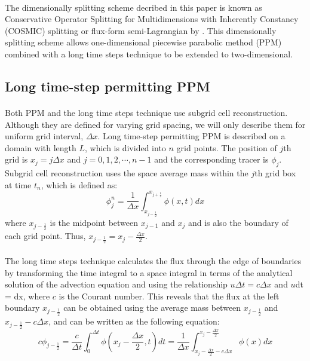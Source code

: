 \paragraph{}
The dimensionally splitting scheme decribed in this paper is known as Conservative Operator Splitting for Multidimensions with Inherently Constancy (COSMIC) splitting \citep{Leonard1996} or flux-form semi-Lagrangian by \citep{Lin1996}. This dimensionally splitting scheme allows one-dimensional piecewise parabolic method (PPM) \citep{Colella1984} combined with a long time steps technique \citep{Leonard1995} to be extended to two-dimensional.
\subsection{Long time-step permitting PPM} 
\label{sec:PPM} 
\paragraph{} 
Both PPM and the long time steps technique use subgrid cell reconstruction. Although they are defined for varying grid spacing, we will only describe them for uniform grid interval, $\Delta x$. Long time-step permitting PPM is described on a domain with length $L$, which is divided into $n$ grid points. The position of $j$th grid is $x_j = j\Delta x$ and $j = 0, 1, 2, \cdots, n-1$ and the corresponding tracer is $\phi_j$. Subgrid cell reconstruction uses the space average mass within the $j$th grid box at time $t_n$, which is defined as: 
\begin{equation} \label{eq:2.1} 
\phi^n_j = \frac{1}{\Delta x} \int^{x_{j+\frac{1}{2}}}_{x_{j-\frac{1}{2}}} \phi (x,t)dx
\end{equation}
where $x_{j-\frac{1}{2}}$ is the midpoint between $x_{j-1}$ and $x_{j}$ and is also the boundary of each grid point. Thus, $x_{j-\frac{1}{2}} = x_j - \frac{\Delta x}{2}$.
\paragraph{} 
The long time steps technique \citep{Leonard1995} calculates the flux through the edge of boundaries by transforming the time integral to a space integral in terms of the analytical solution of the advection equation and using the relationship $u\Delta t = c\Delta x$ and $u$dt = dx, where $c$ is the Courant number. This reveals that the flux at the left boundary $x_{j-\frac{1}{2}}$ can be obtained using the average mass between $x_{j-\frac{1}{2}}$ and $x_{j-\frac{1}{2}}-c\Delta x$, and can be written as the following equation:
\begin{equation} \label{eq:2.2} 
c\phi_{j-\frac{1}{2}} = \frac{c}{\Delta t} \int^{\Delta t}_{0} \phi (x_j - \frac{\Delta x}{2}, t)dt = \frac{1}{\Delta x} \int^{x_j-\frac {\Delta x}{2}}_{x_j-\frac {\Delta x}{2}-c\Delta x} \phi (x)dx 
\end{equation} 
